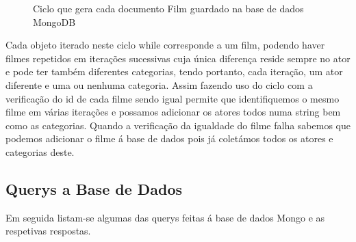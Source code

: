 \begin{itemize}
\begin{figure}[H]
  \caption {Ciclo que gera cada documento Film guardado na base de dados MongoDB}

  \label {fig1}

\end{figure}

Cada objeto iterado neste ciclo while corresponde a um film, podendo haver filmes repetidos em iterações sucessivas cuja única diferença reside sempre no ator e pode ter também diferentes categorias, tendo portanto, cada iteração, um ator diferente e uma ou nenhuma categoria. Assim fazendo uso do ciclo com a verificação do id de cada filme sendo igual permite que identifiquemos o mesmo filme em várias iterações e possamos adicionar os atores todos numa string bem como as categorias. Quando a verificação da igualdade do filme falha sabemos que podemos adicionar o filme á base de dados pois já coletámos todos os atores e categorias deste.

\end{itemize}
\subsection{Querys a Base de Dados}

Em seguida listam-se algumas das querys feitas á base de dados Mongo e as respetivas respostas.

